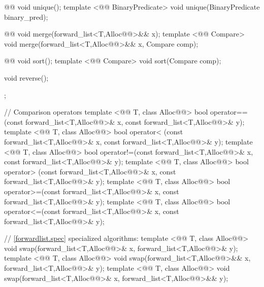 \documentclass[american,twoside]{book}
\begin{document}
\begin{codeblock}
{{    @@ void unique(); 
    template <@@ BinaryPredicate>
      void unique(BinaryPredicate binary_pred); 

    @@ void merge(forward_list<T,Alloc@@>&& x); 
    template <@@ Compare> 
      void merge(forward_list<T,Alloc@@>&& x, Compare comp);

    @@ void sort(); 
    template <@@ Compare> void sort(Compare comp); 

    void reverse(); 
  }; 

  // Comparison operators
  template <@@ T, class Alloc@@> 
    bool operator==(const forward_list<T,Alloc@@>& x, const forward_list<T,Alloc@@>& y); 
  template <@@ T, class Alloc@@> 
    bool operator< (const forward_list<T,Alloc@@>& x, const forward_list<T,Alloc@@>& y); 
  template <@@ T, class Alloc@@> 
    bool operator!=(const forward_list<T,Alloc@@>& x, const forward_list<T,Alloc@@>& y); 
  template <@@ T, class Alloc@@> 
    bool operator> (const forward_list<T,Alloc@@>& x, const forward_list<T,Alloc@@>& y); 
  template <@@ T, class Alloc@@> 
    bool operator>=(const forward_list<T,Alloc@@>& x, const forward_list<T,Alloc@@>& y); 
  template <@@ T, class Alloc@@> 
    bool operator<=(const forward_list<T,Alloc@@>& x, const forward_list<T,Alloc@@>& y); 

  // \ref{forwardlist.spec} specialized algorithms: 
  template <@@ T, class Alloc@@> 
    void swap(forward_list<T,Alloc@@>& x, forward_list<T,Alloc@@>& y);
  template <@@ T, class Alloc@@> 
    void swap(forward_list<T,Alloc@@>&& x, forward_list<T,Alloc@@>& y);
  template <@@ T, class Alloc@@> 
    void swap(forward_list<T,Alloc@@>& x, forward_list<T,Alloc@@>&& y); 
}
\end{codeblock}
\end{document}
